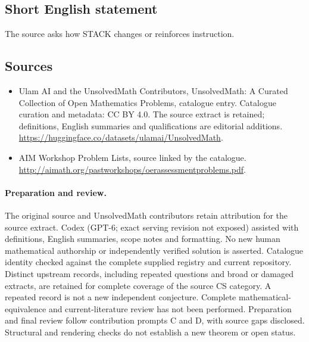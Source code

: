 \documentclass[11pt]{article}
\begin{document}
\subsection{Short English statement}
The source asks how STACK changes or reinforces instruction.
\subsection{Sources}
\begin{itemize}
\item[\hypertarget{source:statement:1}{S1}] Ulam AI and the UnsolvedMath Contributors, UnsolvedMath: A Curated Collection of Open Mathematics Problems, catalogue entry. Catalogue curation and metadata: CC BY 4.0. The source extract is retained; definitions, English summaries and qualifications are editorial additions.
\url{https://huggingface.co/datasets/ulamai/UnsolvedMath}.
\item[\hypertarget{source:statement:2}{S2}] AIM Workshop Problem Lists, source linked by the catalogue.
\url{http://aimath.org/pastworkshops/oerassessmentproblems.pdf}.
\end{itemize}
\paragraph{Preparation and review.}
The original source and UnsolvedMath contributors retain attribution for the source extract. Codex (GPT-6; exact serving revision not exposed) assisted with definitions, English summaries, scope notes and formatting. No new human mathematical authorship or independently verified solution is asserted. Catalogue identity checked against the complete supplied registry and current repository. Distinct upstream records, including repeated questions and broad or damaged extracts, are retained for complete coverage of the source CS category. A repeated record is not a new independent conjecture. Complete mathematical-equivalence and current-literature review has not been performed. Preparation and final review follow contribution prompts C and D, with source gaps disclosed. Structural and rendering checks do not establish a new theorem or open status.
\label{end:statement}
\end{document}
